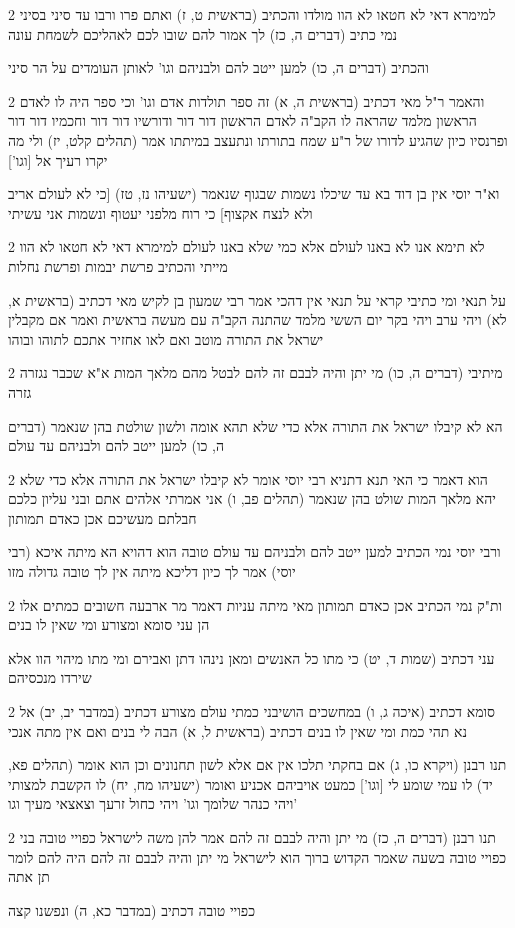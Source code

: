 \documentclass[12pt, openany]{book}
\newcommand{\sethebfont}{
\fontsize{10.5pt}{21.0pt} \selectfont
}
\newcommand{\twocol}[1]{
	{\sethebfont \begin{multicols}{2}
			#1
	\end{multicols}}	
}
\begin{document}
\twocol{למימרא דאי לא חטאו לא הוו מולדו והכתיב (בראשית ט, ז) ואתם פרו ורבו עד סיני בסיני נמי כתיב (דברים ה, כז) לך אמור להם שובו לכם לאהליכם לשמחת עונה
\par והכתיב (דברים ה, כו) למען ייטב להם ולבניהם וגו' לאותן העומדים על הר סיני}
\twocol{והאמר ר"ל מאי דכתיב (בראשית ה, א) זה ספר תולדות אדם וגו' וכי ספר היה לו לאדם הראשון מלמד שהראה לו הקב"ה לאדם הראשון דור דור ודורשיו דור דור וחכמיו דור דור ופרנסיו כיון שהגיע לדורו של ר"ע שמח בתורתו ונתעצב במיתתו אמר (תהלים קלט, יז) ולי מה יקרו רעיך אל [וגו']
\par וא"ר יוסי אין בן דוד בא עד שיכלו נשמות שבגוף שנאמר (ישעיהו נז, טז) [כי לא לעולם אריב ולא לנצח אקצוף] כי רוח מלפני יעטוף ונשמות אני עשיתי}
\twocol{לא תימא אנו לא באנו לעולם אלא כמי שלא באנו לעולם למימרא דאי לא חטאו לא הוו מייתי והכתיב פרשת יבמות ופרשת נחלות
\par על תנאי ומי כתיבי קראי על תנאי אין דהכי אמר רבי שמעון בן לקיש מאי דכתיב (בראשית א, לא) ויהי ערב ויהי בקר יום הששי מלמד שהתנה הקב"ה עם מעשה בראשית ואמר אם מקבלין ישראל את התורה מוטב ואם לאו אחזיר אתכם לתוהו ובוהו}
\twocol{מיתיבי (דברים ה, כו) מי יתן והיה לבבם זה להם לבטל מהם מלאך המות א"א שכבר נגזרה גזרה
\par הא לא קיבלו ישראל את התורה אלא כדי שלא תהא אומה ולשון שולטת בהן שנאמר (דברים ה, כו) למען ייטב להם ולבניהם עד עולם}
\twocol{הוא דאמר כי האי תנא דתניא רבי יוסי אומר לא קיבלו ישראל את התורה אלא כדי שלא יהא מלאך המות שולט בהן שנאמר (תהלים פב, ו) אני אמרתי אלהים אתם ובני עליון כלכם חבלתם מעשיכם אכן כאדם תמותון
\par ורבי יוסי נמי הכתיב למען ייטב להם ולבניהם עד עולם טובה הוא דהויא הא מיתה איכא (רבי יוסי) אמר לך כיון דליכא מיתה אין לך טובה גדולה מזו}
\twocol{ות"ק נמי הכתיב אכן כאדם תמותון מאי מיתה עניות דאמר מר ארבעה חשובים כמתים אלו הן עני סומא ומצורע ומי שאין לו בנים
\par עני דכתיב (שמות ד, יט) כי מתו כל האנשים ומאן נינהו דתן ואבירם ומי מתו מיהוי הוו אלא שירדו מנכסיהם}
\twocol{סומא דכתיב (איכה ג, ו) במחשכים הושיבני כמתי עולם מצורע דכתיב (במדבר יב, יב) אל נא תהי כמת ומי שאין לו בנים דכתיב (בראשית ל, א) הבה לי בנים ואם אין מתה אנכי
\par תנו רבנן (ויקרא כו, ג) אם בחקתי תלכו אין אם אלא לשון תחנונים וכן הוא אומר (תהלים פא, יד) לו עמי שומע לי [וגו'] כמעט אויביהם אכניע ואומר (ישעיהו מח, יח) לו הקשבת למצותי ויהי כנהר שלומך וגו' ויהי כחול זרעך וצאצאי מעיך וגו'}
\twocol{תנו רבנן (דברים ה, כז) מי יתן והיה לבבם זה להם אמר להן משה לישראל כפויי טובה בני כפויי טובה בשעה שאמר הקדוש ברוך הוא לישראל מי יתן והיה לבבם זה להם היה להם לומר תן אתה
\par כפויי טובה דכתיב (במדבר כא, ה) ונפשנו קצה}
\end{document}
